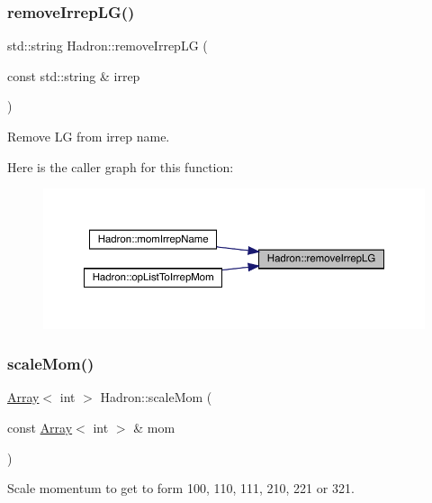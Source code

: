 \subsubsection{\texorpdfstring{removeIrrepLG()}{removeIrrepLG()}}
{\footnotesize\ttfamily std\+::string Hadron\+::remove\+Irrep\+LG (\begin{DoxyParamCaption}\item[{const std\+::string \&}]{irrep }\end{DoxyParamCaption})}



Remove LG from irrep name. 

Here is the caller graph for this function\+:
\nopagebreak
\begin{figure}[H]
\begin{center}
\leavevmode
\includegraphics[width=350pt]{d1/daf/namespaceHadron_aff55b5fd81ffee95432b7d4e1c8d01e6_icgraph}
\end{center}
\end{figure}
\mbox{\label{namespaceHadron_ab3424b316e2a4d8e820c88f8027742e1}} 
\subsubsection{\texorpdfstring{scaleMom()}{scaleMom()}}
{\footnotesize\ttfamily \mbox{\hyperlink{classXMLArray_1_1Array}{Array}}$<$ int $>$ Hadron\+::scale\+Mom (\begin{DoxyParamCaption}\item[{const \mbox{\hyperlink{classXMLArray_1_1Array}{Array}}$<$ int $>$ \&}]{mom }\end{DoxyParamCaption})}



Scale momentum to get to form 100, 110, 111, 210, 221 or 321. 

